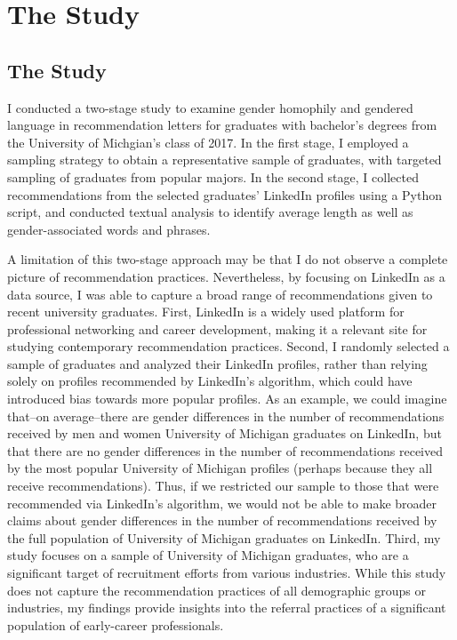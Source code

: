 \documentclass[12pt]{caltech_thesis}
\begin{document}
\chapter{The Study}
\section{The Study}
I conducted a two-stage study to examine gender homophily and gendered language in recommendation letters for graduates with bachelor’s degrees from the University of Michgian’s class of 2017. In the first stage, I employed a sampling strategy to obtain a representative sample of graduates, with targeted sampling of graduates from popular majors. In the second stage, I collected recommendations from the selected graduates’ LinkedIn profiles using a Python script, and conducted textual analysis to identify average length as well as gender-associated words and phrases.

A limitation of this two-stage approach may be that I do not observe a complete picture of recommendation practices. Nevertheless, by focusing on LinkedIn as a data source, I was able to capture a broad range of recommendations given to recent university graduates. First, LinkedIn is a widely used platform for professional networking and career development, making it a relevant site for studying contemporary recommendation practices. Second, I randomly selected a sample of graduates and analyzed their LinkedIn profiles, rather than relying solely on profiles recommended by LinkedIn's algorithm, which could have introduced bias towards more popular profiles. As an example, we could imagine that–on average–there are gender differences in the number of recommendations received by men and women University of Michigan graduates on LinkedIn, but that there are no gender differences in the number of recommendations received by the most popular University of Michigan profiles (perhaps because they all receive recommendations). Thus, if we restricted our sample to those that were recommended via LinkedIn’s algorithm, we would not be able to make broader claims about gender differences in the number of recommendations received by the full population of University of Michigan  graduates on LinkedIn. Third, my study focuses on a sample of University of Michigan graduates, who are a significant target of recruitment efforts from various industries. While this study does not capture the recommendation practices of all demographic groups or industries, my findings provide insights into the referral practices of a significant population of early-career professionals.
\end{document}
